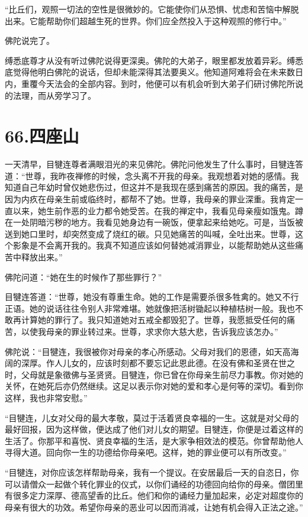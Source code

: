 \documentclass[12pt,twoside,openany]{book}
\begin{document}
“比丘们，观照一切法的空性是很微妙的。它能使你们从恐惧、忧虑和苦恼中解脱出来。它能帮助你们超越生死的世界。你们应全然投入于这种观照的修行中。”

佛陀说完了。

缚悉底尊才从没有听过佛陀说得更深奥。佛陀的大弟子，眼里都发放着异彩。缚悉底觉得他明白佛陀的说话，但却未能深得其法要奥义。他知道阿难将会在未来数日内，重覆今天法会的全部内容。到时，他便可以有机会听到大弟子们研讨佛陀所说的法理，而从旁学习了。


\chapter{66.四座山}\label{ch66}

一天清早，目犍连尊者满眼泪光的来见佛陀。佛陀问他发生了什么事时，目犍连答道：“世尊，我昨夜禅修的时候，念头离不开我的母亲。我观想着对她的感情。我知道自己年幼时曾仅她悲伤过，但这并不是我现在感到痛苦的原因。我的痛苦，是因为内疚在母亲生前或临终时，都帮不了她。世尊，我母亲的罪业深重。我肯定一直以来，她生前作恶的业力都令她受苦。在我的禅定中，我看见母亲瘦如饿鬼。蹲在一处阴暗污秽的地方。我看见她身边有一碗饭，便拿起来给她吃。可是，当饭被送到她口里时，却突然变成了烧红的碳。只见她痛苦的叫喊，全吐出来。世尊，这个影象是不会离开我的。我真不知道应该如何替她减消罪业，以能帮助她从这些痛苦中释放出来。”

佛陀问道：“她在生的时候作了那些罪行？”

目犍连答道：“世尊，她没有尊重生命。她的工作是需要杀很多牲禽的。她又不行正语。她的说话往往令别人非常难堪。她就像把活树锄起以种植桔树一般。我也不敢再计算她的罪行了。我只知道她对五戒全都毁犯了。世尊，我愿抵受任何的痛苦，以使我母亲的罪业转过来。世尊，求求你大慈大悲，告诉我应该怎办。”

佛陀说：“目犍连，我很被你对母亲的孝心所感动。父母对我们的恩德，如天高海阔的深厚。作人儿女的，应该时刻都不要忘记此恩此德。在没有佛和圣贤在世之时，父母就是象徵佛与圣贤贤。目犍连，你已曾在你母亲生前尽力事教。你对她的关怀，在她死后亦仍然继续。这足以表示你对她的爱和孝心是何等的深切。看到你这样，我也非常安慰。”

“目犍连，儿女对父母的最大孝敬，莫过于活着贤良幸福的一生。这就是对父母的最好回报，因为这样做，便达成了他们对儿女的期望。目犍连，你便是过着这样的生活了。你那平和喜悦、贤良幸福的生活，是大家争相效法的模范。你曾帮助他人寻得大道。回向你一生的功德给你母亲吧。这样，她的罪业便可以有所改变。”

“目犍连，对你应该怎样帮助母亲，我有一个提议。在安居最后一天的自恣日，你可以请僧众一起做个转化罪业的仪式，以你们诵经的功德回向给你的母亲。僧团里有很多定力深厚、德高望香的比丘。他们和你的诵经力量加起来，必定对超度你的母亲有很大的功效。希望你母亲的恶业可以因而消减，让她有机会得入正法之途。”
\end{document}
